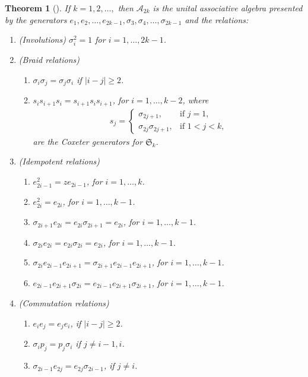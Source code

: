 \documentclass[11pt,a4paper,reqno,svgnames]{amsart}
\theoremstyle{plain}
\newtheorem{theorem}{Theorem}[section]
\theoremstyle{definition}
\numberwithin{equation}{section}
\begin{document}
\begin{theorem}[{\cite[Theorem~4.1]{MR3035512}}]\label{n-pres}
If $k=1,2,\ldots,$ then $\mathcal{A}_{2k}$ is the unital associative algebra presented by the generators $e_1,e_2,\ldots,e_{2k-1},\sigma_3,\sigma_4,\ldots,\sigma_{2k-1}$ 
and the relations:
\begin{enumerate}
\item (Involutions)\label{inv} $\sigma_i^2=1$ for $i=1,\ldots,2k-1$. 
\item (Braid relations) \label{brd}
\begin{enumerate}
\item $\sigma_{i}\sigma_{j}=\sigma_{j}\sigma_{i}$ if $|i-j|{\geqslant} 2$. \label{brd-1}
\item $s_is_{i+1}s_i=s_{i+1}s_is_{i+1}$, for $i=1,\ldots,k-2$, where \label{brd-4}
\begin{align*}
s_j=
\begin{cases}
\sigma_{2j+1},&\text{if $j=1$,}\\
\sigma_{2j}\sigma_{2j+1},&\text{if $1<j<k$,}
\end{cases}
\end{align*}
are the Coxeter generators for $\mathfrak{S}_k$.
\end{enumerate}
\item (Idempotent relations)\label{ide}
\begin{enumerate}
\item $e_{2i-1}^2=ze_{2i-1}$, for $i=1,\ldots,k$.\label{ide-1}
\item $e_{2i}^2=e_{2i}$, for $i=1,\ldots,k-1$.\label{ide-2}
\item $\sigma_{2i+1}e_{2i}=e_{2i}\sigma_{2i+1}=e_{2i}$, for $i=1,\ldots,k-1$.\label{ide-3}
\item $\sigma_{2i}e_{2i}=e_{2i}\sigma_{2i}=e_{2i}$, for $i=1,\ldots,k-1$. \label{ide-4}
\item $\sigma_{2i}e_{2i-1}e_{2i+1}=\sigma_{2i+1}e_{2i-1}e_{2i+1}$, for $i=1,\ldots,k-1$.\label{ide-5}
\item $e_{2i-1}e_{2i+1}\sigma_{2i}=e_{2i-1}e_{2i+1}\sigma_{2i+1}$, for $i=1,\ldots,k-1$.\label{ide-6}
\end{enumerate}
\item (Commutation relations)\label{com}
\begin{enumerate}
\item $e_ie_j=e_je_i$, if $|i-j|{\geqslant} 2$.\label{com-1}
\item $\sigma_ip_j=p_j\sigma_i$ if $j\ne i-1,i$. \label{com-4}
\item $\sigma_{2i-1}e_{2j}=e_{2j}\sigma_{2i-1}$, if $j\ne i$. \label{com-5}

\end{enumerate}
\end{enumerate}
\end{theorem}
\end{document}
